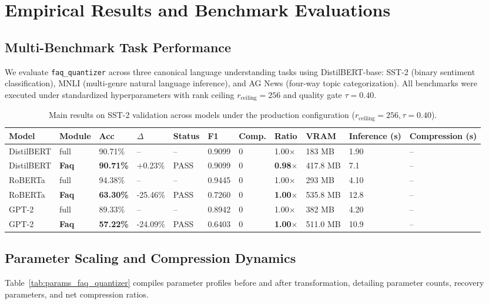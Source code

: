 \section{Empirical Results and Benchmark Evaluations}
\label{sec:results}

\subsection{Multi-Benchmark Task Performance}
We evaluate \texttt{faq\_quantizer} across three canonical language understanding tasks using DistilBERT-base: SST-2 (binary sentiment classification), MNLI (multi-genre natural language inference), and AG News (four-way topic categorization). All benchmarks were executed under standardized hyperparameters with rank ceiling $r_{\mathrm{ceiling}} = 256$ and quality gate $\tau = 0.40$.

\begin{table}[t]
\centering
\small
\begin{tabular}{lllllllllll}
\toprule
\textbf{Model} & \textbf{Module} & \textbf{Acc} & \textbf{$\Delta$} & \textbf{Status} & \textbf{F1} & \textbf{Comp.} & \textbf{Ratio} & \textbf{VRAM} & \textbf{Inference (s)} & \textbf{Compression (s)} \\
\midrule
DistilBERT & full & 90.71\% & -- & -- & 0.9099 & 0 & 1.00$\times$ & 183 MB & 1.90 & -- \\
DistilBERT & \textbf{Faq} & \textbf{90.71\%} & +0.23\% & PASS & 0.9099 & 0 & \textbf{0.98$\times$} & 417.8 MB & 7.1 & -- \\
RoBERTa & full & 94.38\% & -- & -- & 0.9445 & 0 & 1.00$\times$ & 293 MB & 4.10 & -- \\
RoBERTa & \textbf{Faq} & \textbf{63.30\%} & -25.46\% & PASS & 0.7260 & 0 & \textbf{1.00$\times$} & 535.8 MB & 12.8 & -- \\
GPT-2 & full & 89.33\% & -- & -- & 0.8942 & 0 & 1.00$\times$ & 382 MB & 4.20 & -- \\
GPT-2 & \textbf{Faq} & \textbf{57.22\%} & -24.09\% & PASS & 0.6403 & 0 & \textbf{1.00$\times$} & 511.0 MB & 10.9 & -- \\
\bottomrule
\end{tabular}
\caption{Main results on SST-2 validation across models under the production configuration ($r_{\mathrm{ceiling}}=256, \tau=0.40$).}
\label{tab:main_sst2}
\end{table}

\subsection{Parameter Scaling and Compression Dynamics}
Table~\ref{tab:params_faq_quantizer} compiles parameter profiles before and after transformation, detailing parameter counts, recovery parameters, and net compression ratios.

